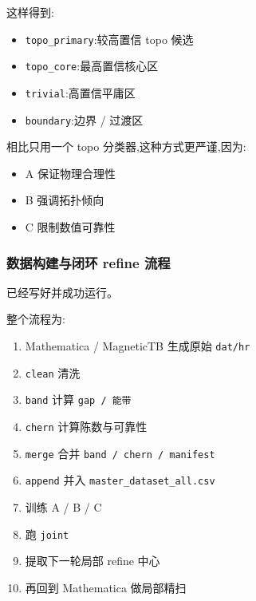 \documentclass[lang=cn,scheme=chinese,color=blue,device=normal,toc=onecol,math=cm]{elegantbook}
\begin{document}
这样得到:\par


\begin{itemize}
\item \texttt{topo\_\allowbreak{}primary}:较高置信 topo 候选
\item \texttt{topo\_\allowbreak{}core}:最高置信核心区
\item \texttt{trivial}:高置信平庸区
\item \texttt{boundary}:边界 /\allowbreak{} 过渡区
\end{itemize}


相比只用一个 topo 分类器,这种方式更严谨,因为:\par


\begin{itemize}
\item A 保证物理合理性
\item B 强调拓扑倾向
\item C 限制数值可靠性
\end{itemize}


\subsubsection{数据构建与闭环 refine 流程}


已经写好并成功运行。\par


整个流程为:\par


\begin{enumerate}
\item Mathematica /\allowbreak{} MagneticTB 生成原始 \texttt{dat/\allowbreak{}hr}
\item \texttt{clean} 清洗
\item \texttt{band} 计算 \texttt{gap /\allowbreak{} 能带}
\item \texttt{chern} 计算陈数与可靠性
\item \texttt{merge} 合并 \texttt{band /\allowbreak{} chern /\allowbreak{} manifest}
\item \texttt{append} 并入 \texttt{master\_\allowbreak{}dataset\_\allowbreak{}all.csv}
\item 训练 A /\allowbreak{} B /\allowbreak{} C
\item 跑 \texttt{joint}
\item 提取下一轮局部 refine 中心
\item 再回到 Mathematica 做局部精扫
\end{enumerate}
\end{document}
